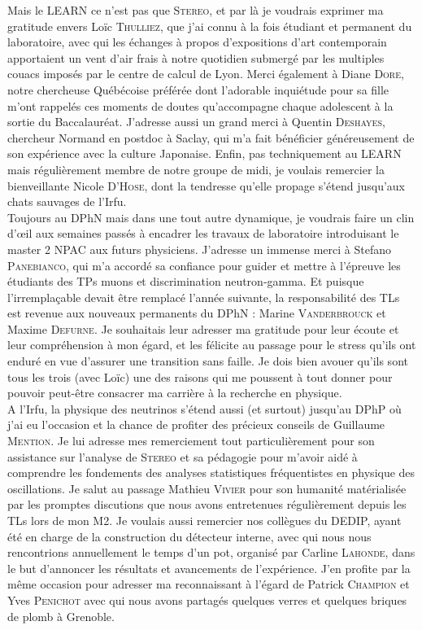 Mais le LEARN ce n'est pas que \textsc{Stereo}, et par là je voudrais exprimer ma gratitude envers Loïc \textsc{Thulliez}, que j'ai connu à la fois étudiant et permanent du laboratoire, avec qui les échanges à propos d'expositions d'art contemporain apportaient un vent d'air frais à notre quotidien submergé par les multiples couacs imposés par le centre de calcul de Lyon. Merci également à Diane \textsc{Dore}, notre chercheuse Québécoise préférée dont l'adorable inquiétude pour sa fille m'ont rappelés ces moments de doutes qu'accompagne chaque adolescent à la sortie du Baccalauréat. J'adresse aussi un grand merci à Quentin \textsc{Deshayes}, chercheur Normand en postdoc à Saclay, qui m'a fait bénéficier généreusement de son expérience avec la culture Japonaise. Enfin, pas techniquement au LEARN mais régulièrement membre de notre groupe de midi, je voulais remercier la bienveillante Nicole \textsc{D'Hose}, dont la tendresse qu'elle propage s'étend jusqu'aux chats sauvages de l'Irfu.\\

Toujours au DPhN mais dans une tout autre dynamique, je voudrais faire un clin d'\oe il aux semaines passés à encadrer les travaux de laboratoire introduisant le master 2 NPAC aux futurs physiciens. J'adresse un immense merci à Stefano \textsc{Panebianco}, qui m'a accordé sa confiance pour guider et mettre à l'épreuve les étudiants des TPs muons et discrimination neutron-gamma. Et puisque l'irremplaçable devait être remplacé l'année suivante, la responsabilité des TLs est revenue aux nouveaux permanents du DPhN : Marine \textsc{Vanderbrouck} et Maxime \textsc{Defurne}. Je souhaitais leur adresser ma gratitude pour leur écoute et leur compréhension à mon égard, et les félicite au passage pour le stress qu'ils ont enduré en vue d'assurer une transition sans faille. Je dois bien avouer qu'ils sont tous les trois (avec Loïc) une des raisons qui me poussent à tout donner pour pouvoir peut-être consacrer ma carrière à la recherche en physique.\\

A l'Irfu, la physique des neutrinos s'étend aussi (et surtout) jusqu'au DPhP où j'ai eu l'occasion et la chance de profiter des précieux conseils de Guillaume \textsc{Mention}. Je lui adresse mes remerciement tout particulièrement pour son assistance sur l'analyse de \textsc{Stereo} et sa pédagogie pour m'avoir aidé à comprendre les fondements des analyses statistiques fréquentistes en physique des oscillations. Je salut au passage Mathieu \textsc{Vivier} pour son humanité matérialisée par les promptes discutions que nous avons entretenues régulièrement depuis les TLs lors de mon M2. Je voulais aussi remercier nos collègues du DEDIP, ayant été en charge de la construction du détecteur interne, avec qui nous nous rencontrions annuellement le temps d'un pot, organisé par Carline \textsc{Lahonde}, dans le but d'annoncer les résultats et avancements de l'expérience. J'en profite par la même occasion pour adresser ma reconnaissant à l'égard de Patrick \textsc{Champion} et Yves \textsc{Penichot} avec qui nous avons partagés quelques verres et quelques briques de plomb à Grenoble.\\


